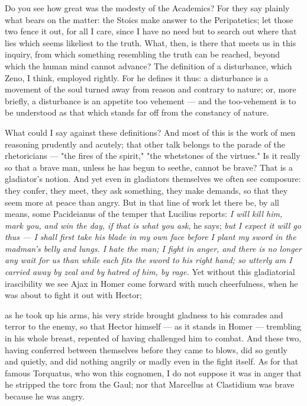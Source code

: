  Do you see how great was the modesty of the Academics? For they say plainly what bears on the matter: the Stoics make answer to the Peripatetics; let those two fence it out, for all I care, since I have no need but to search out where that lies which seems likeliest to the truth. What, then, is there that meets us in this inquiry, from which something resembling the truth can be reached, beyond which the human mind cannot advance? The definition of a disturbance, which Zeno, I think, employed rightly. For he defines it thus: a disturbance is a movement of the soul turned away from reason and contrary to nature; or, more briefly, a disturbance is an appetite too vehement — and the too-vehement is to be understood as that which stands far off from the constancy of nature.

 What could I say against these definitions? And most of this is the work of men reasoning prudently and acutely; that other talk belongs to the parade of the rhetoricians — "the fires of the spirit," "the whetstones of the virtues." Is it really so that a brave man, unless he has begun to seethe, cannot be brave? That is a gladiator's notion. And yet even in gladiators themselves we often see composure: they confer, they meet, they ask something, they make demands, so that they seem more at peace than angry. But in that line of work let there be, by all means, some Pacideianus of the temper that Lucilius reports: \textit{I will kill him, mark you, and win the day, if that is what you ask}, he says; \textit{but I expect it will go thus — I shall first take his blade in my own face before I plant my sword in the madman's belly and lungs. I hate the man; I fight in anger, and there is no longer any wait for us than while each fits the sword to his right hand; so utterly am I carried away by zeal and by hatred of him, by rage.} Yet without this gladiatorial irascibility we see Ajax in Homer come forward with much cheerfulness, when he was about to fight it out with Hector;

 as he took up his arms, his very stride brought gladness to his comrades and terror to the enemy, so that Hector himself — as it stands in Homer — trembling in his whole breast, repented of having challenged him to combat. And these two, having conferred between themselves before they came to blows, did so gently and quietly, and did nothing angrily or madly even in the fight itself. As for that famous Torquatus, who won this cognomen, I do not suppose it was in anger that he stripped the torc from the Gaul; nor that Marcellus at Clastidium was brave because he was angry.

